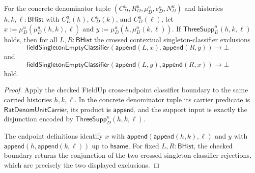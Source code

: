 \begin{theorem}
\label{thm:ratup-fieldup-bracketing-independent-cross-endpoint-classifier-boundary}
For the concrete denominator tuple $(C_D^u,R_D^u,\mu_D^u,e_D^u,N_D^u)$ and
histories $h,k,\ell:\mathsf{BHist}$ with $C_D^u(h)$, $C_D^u(k)$, and
$C_D^u(\ell)$, let $x:=\mu_D^u(\mu_D^u(h,k),\ell)$ and
$y:=\mu_D^u(h,\mu_D^u(k,\ell))$. If
$\mathsf{ThreeSupp}_D^u(h,k,\ell)$ holds, then for all $L,R:\mathsf{BHist}$ the
crossed contextual singleton-classifier exclusions
$$
\mathsf{fieldSingletonEmptyClassifier}(\mathsf{append}(L,x),\mathsf{append}(R,y))
\to\bot
$$
and
$$
\mathsf{fieldSingletonEmptyClassifier}(\mathsf{append}(L,y),\mathsf{append}(R,x))
\to\bot
$$
hold.
\end{theorem}
\begin{proof}
Apply the checked FieldUp cross-endpoint classifier boundary to the same
carried histories $h,k,\ell$. In the concrete denominator tuple its carrier
predicate is $\mathsf{RatDenomUnitCarrier}$, its product is
$\mathsf{append}$, and the support input is exactly the disjunction encoded by
$\mathsf{ThreeSupp}_D^u(h,k,\ell)$.

The endpoint definitions identify $x$ with
$\mathsf{append}(\mathsf{append}(h,k),\ell)$ and $y$ with
$\mathsf{append}(h,\mathsf{append}(k,\ell))$ up to $\mathsf{hsame}$. For fixed
$L,R:\mathsf{BHist}$, the checked boundary returns the conjunction of the two
crossed singleton-classifier rejections, which are precisely the two displayed
exclusions.
\end{proof}

